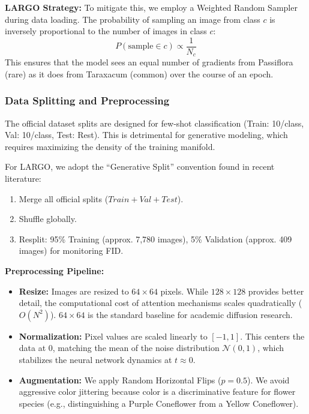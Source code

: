 \documentclass[12pt, a4paper]{article}
\begin{document}
\textbf{LARGO Strategy:} To mitigate this, we employ a Weighted Random Sampler during data loading. The probability of sampling an image from class $c$ is inversely proportional to the number of images in class $c$:
\begin{equation}
    P(\text{sample} \in c) \propto \frac{1}{N_c}
\end{equation}
This ensures that the model sees an equal number of gradients from Passiflora (rare) as it does from Taraxacum (common) over the course of an epoch.

\subsubsection{Data Splitting and Preprocessing}
The official dataset splits are designed for few-shot classification (Train: 10/class, Val: 10/class, Test: Rest). This is detrimental for generative modeling, which requires maximizing the density of the training manifold.

For LARGO, we adopt the ``Generative Split'' convention found in recent literature:
\begin{enumerate}
    \item Merge all official splits ($Train+Val+Test$).
    \item Shuffle globally.
    \item Resplit: 95\% Training (approx. 7,780 images), 5\% Validation (approx. 409 images) for monitoring FID.
\end{enumerate}

\textbf{Preprocessing Pipeline:}
\begin{itemize}
    \item \textbf{Resize:} Images are resized to $64 \times 64$ pixels. While $128 \times 128$ provides better detail, the computational cost of attention mechanisms scales quadratically ($O(N^2)$). $64 \times 64$ is the standard baseline for academic diffusion research.
    \item \textbf{Normalization:} Pixel values are scaled linearly to $[-1, 1]$. This centers the data at 0, matching the mean of the noise distribution $\mathcal{N}(0, 1)$, which stabilizes the neural network dynamics at $t \approx 0$.
    \item \textbf{Augmentation:} We apply Random Horizontal Flips ($p=0.5$). We avoid aggressive color jittering because color is a discriminative feature for flower species (e.g., distinguishing a Purple Coneflower from a Yellow Coneflower).
\end{itemize}
\end{document}

